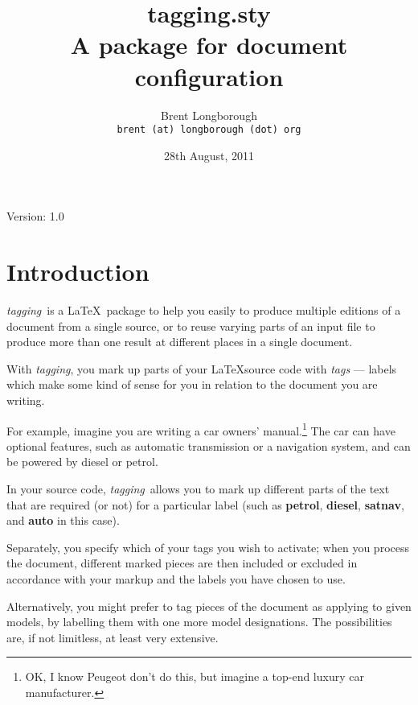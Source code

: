 \documentclass[a4paper,12pt,twoside]{memoir}
\newcommand{\tpfname}{\textsf{tagging.sty}}
\newcommand{\tpname}{\textsf{\itshape tagging}}
\begin{document}
\title{%
	\Huge \tpfname\\[2ex]%
	\Large A package for document configuration
	}
\author{Brent Longborough\\\nolinkurl{brent (at) longborough (dot) org}}
\date{28th August, 2011}
\maketitle
{\centering
Version: 1.0\\
}
\begingroup
{}
\setlength{\afterchapskip}{20pt}
\let\clearpage\relax
\let\chaptitlefont\Large\bfseries
\tableofcontents*
\clearpage
\endgroup
{}
\chapter{Introduction}
\tpname\ is a \LaTeX\ package to help you easily to
produce multiple editions of a document from a single source,
or to reuse varying parts of an input file
to produce more than one result at different places
in a single document.

With \tpname, you mark up parts of your
\LaTeX source code with \textit{tags} --- labels which
make some kind of sense for you in relation to
the document you are writing.

For example, imagine you are writing a car owners' manual.\footnote{%
OK, I know Peugeot don't do this,
but imagine a top-end luxury car manufacturer.}
The car can have optional features, such as automatic transmission
or a navigation system, and can be powered by diesel or petrol.

In your source code, \tpname\ allows you to
mark up different parts of the text that
are required (or not) for a particular label
(such as \textbf{petrol}, \textbf{diesel}, \textbf{satnav},
and \textbf{auto} in this case).

Separately, you specify which of your tags you wish to activate;
when you process the document, different marked pieces are then
included or excluded in accordance with your markup
and the labels you have chosen to use.

Alternatively, you might prefer to tag pieces of the document
as applying to given models, by labelling them with one more
model designations. The possibilities are, if not limitless,
at least very extensive.
\end{document}
